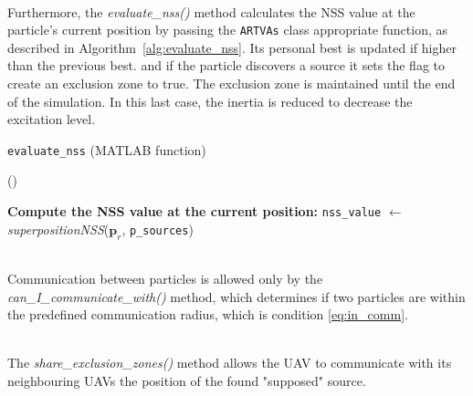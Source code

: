 \documentclass[main]{subfiles}
\begin{document}
\noindent\\
Furthermore, the \textit{evaluate\_nss()} method calculates the 
NSS value at the particle's current position by passing the 
\texttt{ARTVAs} class appropriate function, as described 
in Algorithm~\ref{alg:evaluate_nss}.
Its personal best is updated if higher than the previous best. 
and if the particle discovers a source  
it sets the flag to create an exclusion zone to true.
The exclusion zone is maintained until the end 
of the simulation. 
In this last case, the inertia is reduced to decrease 
the excitation level.
\begin{algorithm}
     \caption{\texttt{evaluate\_nss} (MATLAB function)}\label{alg:evaluate_nss}
     \vspace{0.3\baselineskip}
     \nonl \Fn(\tcc*[h]{}){}{
        \SetAlgoBlockMarkers{}{}
        \DontPrintSemicolon \nonl \textbf{Compute the NSS value at the current position:}\;\PrintSemicolon
        \texttt{nss\_value} $\gets$ \textit{superpositionNSS}($\mathbf{p}_r$, \texttt{p\_sources})\;

 }
 \end{algorithm}

\noindent\\
Communication between particles is allowed only by the 
\textit{can\_I\_communicate\_with()} method, which 
determines if two particles are within the predefined 
communication radius, which is condition \ref{eq:in_comm}.

\noindent\\
The \textit{share\_exclusion\_zones()} 
method allows the UAV to communicate with its 
neighbouring UAVs the position 
of the found "supposed" source.
\end{document}
